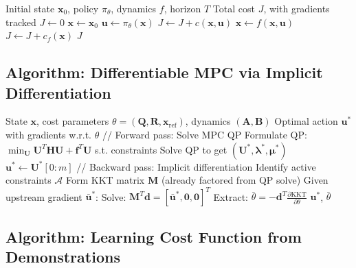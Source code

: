\begin{algorithm}[H]
\caption{Differentiable Trajectory Rollout}
\label{alg:diff_rollout}
\begin{algorithmic}[1]
\REQUIRE Initial state $\mathbf{x}_0$, policy $\pi_\theta$, dynamics $f$, horizon $T$
\ENSURE Total cost $J$, with gradients tracked
\STATE $J \gets 0$
\STATE $\mathbf{x} \gets \mathbf{x}_0$
    \STATE $\mathbf{u} \gets \pi_\theta(\mathbf{x})$ 
    \STATE $J \gets J + c(\mathbf{x}, \mathbf{u})$ 
    \STATE $\mathbf{x} \gets f(\mathbf{x}, \mathbf{u})$ 
\ENDFOR
\STATE $J \gets J + c_f(\mathbf{x})$ 
\RETURN $J$
\end{algorithmic}
\end{algorithm}

\subsection{Algorithm: Differentiable MPC via Implicit Differentiation}

\begin{algorithm}[H]
\caption{Differentiable MPC Layer}
\label{alg:diff_mpc}
\begin{algorithmic}[1]
\REQUIRE State $\mathbf{x}$, cost parameters $\theta = (\mathbf{Q}, \mathbf{R}, \mathbf{x}_{\text{ref}})$, dynamics $(\mathbf{A}, \mathbf{B})$
\ENSURE Optimal action $\mathbf{u}^*$ with gradients w.r.t. $\theta$
\STATE // Forward pass: Solve MPC QP
\STATE Formulate QP: $\min_{\mathbf{U}} \mathbf{U}^T \mathbf{H} \mathbf{U} + \mathbf{f}^T \mathbf{U}$ s.t. constraints
\STATE Solve QP to get $(\mathbf{U}^*, \boldsymbol{\lambda}^*, \boldsymbol{\mu}^*)$
\STATE $\mathbf{u}^* \gets \mathbf{U}^*[0:m]$ 
\STATE // Backward pass: Implicit differentiation
\STATE Identify active constraints $\mathcal{A}$
\STATE Form KKT matrix $\mathbf{M}$ (already factored from QP solve)
\STATE Given upstream gradient $\bar{\mathbf{u}}^*$:
\STATE Solve: $\mathbf{M}^T \mathbf{d} = [\bar{\mathbf{u}}^*, \mathbf{0}, \mathbf{0}]^T$
\STATE Extract: $\bar{\theta} = -\mathbf{d}^T \frac{\partial \text{KKT}}{\partial \theta}$
\RETURN $\mathbf{u}^*$, $\bar{\theta}$
\end{algorithmic}
\end{algorithm}

\subsection{Algorithm: Learning Cost Function from Demonstrations}

